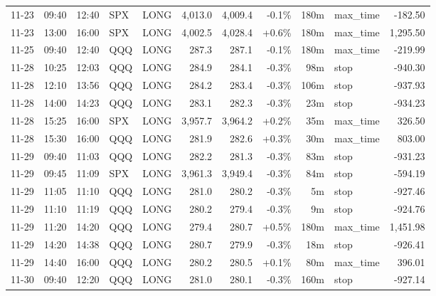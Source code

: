 \documentclass[11pt,a4paper,twoside]{article}
\begin{document}
\begin{center}
\begin{longtable}{>{\color{txtmain}}l l l l l r r r r >{\color{txtmain}}l r}
11-23 & 09:40 & 12:40 & SPX & LONG & 4,013.0 & 4,009.4 & \textcolor{lossred}{-0.1\%} & 180m & max\_time & \textcolor{lossred}{-182.50} \\
11-23 & 13:00 & 16:00 & SPX & LONG & 4,002.5 & 4,028.4 & \textcolor{wingreen}{+0.6\%} & 180m & max\_time & \textcolor{wingreen}{1,295.50} \\
11-25 & 09:40 & 12:40 & QQQ & LONG & 287.3 & 287.1 & \textcolor{lossred}{-0.1\%} & 180m & max\_time & \textcolor{lossred}{-219.99} \\
11-28 & 10:25 & 12:03 & QQQ & LONG & 284.9 & 284.1 & \textcolor{lossred}{-0.3\%} & 98m & stop & \textcolor{lossred}{-940.30} \\
11-28 & 12:10 & 13:56 & QQQ & LONG & 284.2 & 283.4 & \textcolor{lossred}{-0.3\%} & 106m & stop & \textcolor{lossred}{-937.93} \\
11-28 & 14:00 & 14:23 & QQQ & LONG & 283.1 & 282.3 & \textcolor{lossred}{-0.3\%} & 23m & stop & \textcolor{lossred}{-934.23} \\
11-28 & 15:25 & 16:00 & SPX & LONG & 3,957.7 & 3,964.2 & \textcolor{wingreen}{+0.2\%} & 35m & max\_time & \textcolor{wingreen}{326.50} \\
11-28 & 15:30 & 16:00 & QQQ & LONG & 281.9 & 282.6 & \textcolor{wingreen}{+0.3\%} & 30m & max\_time & \textcolor{wingreen}{803.00} \\
11-29 & 09:40 & 11:03 & QQQ & LONG & 282.2 & 281.3 & \textcolor{lossred}{-0.3\%} & 83m & stop & \textcolor{lossred}{-931.23} \\
11-29 & 09:45 & 11:09 & SPX & LONG & 3,961.3 & 3,949.4 & \textcolor{lossred}{-0.3\%} & 84m & stop & \textcolor{lossred}{-594.19} \\
11-29 & 11:05 & 11:10 & QQQ & LONG & 281.0 & 280.2 & \textcolor{lossred}{-0.3\%} & 5m & stop & \textcolor{lossred}{-927.46} \\
11-29 & 11:10 & 11:19 & QQQ & LONG & 280.2 & 279.4 & \textcolor{lossred}{-0.3\%} & 9m & stop & \textcolor{lossred}{-924.76} \\
11-29 & 11:20 & 14:20 & QQQ & LONG & 279.4 & 280.7 & \textcolor{wingreen}{+0.5\%} & 180m & max\_time & \textcolor{wingreen}{1,451.98} \\
11-29 & 14:20 & 14:38 & QQQ & LONG & 280.7 & 279.9 & \textcolor{lossred}{-0.3\%} & 18m & stop & \textcolor{lossred}{-926.41} \\
11-29 & 14:40 & 16:00 & QQQ & LONG & 280.2 & 280.5 & \textcolor{wingreen}{+0.1\%} & 80m & max\_time & \textcolor{wingreen}{396.01} \\
11-30 & 09:40 & 12:20 & QQQ & LONG & 281.0 & 280.1 & \textcolor{lossred}{-0.3\%} & 160m & stop & \textcolor{lossred}{-927.14} \\

\end{longtable}
\end{center}
\end{document}
